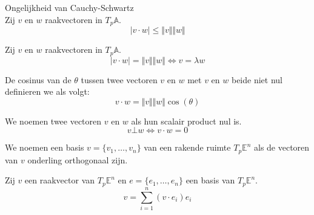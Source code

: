 \documentclass[main.tex]{subfiles}
\begin{document}
\begin{ei}
  Ongelijkheid van Cauchy-Schwartz\\
  Zij $v$ en $w$ raakvectoren in $T_{p}\mathbb{A}$.
  \[ |v \cdot w| \le \Vert v \Vert \Vert w \Vert \]
\end{ei}

\begin{ei}
  Zij $v$ en $w$ raakvectoren in $T_{p}\mathbb{A}$.
  \[ |v \cdot w| = \Vert v \Vert \Vert w \Vert \Leftrightarrow v = \lambda w \]
\end{ei}

\begin{de}
  De cosinus van de  $\theta$ tussen twee vectoren $v$ en $w$ met $v$ en $w$ beide niet nul definieren we als volgt:
  \[ v \cdot w = \Vert v \Vert \Vert w \Vert \cos(\theta) \]
\end{de}

\begin{de}
  We noemen twee vectoren $v$ en $w$  als hun scalair product nul is.
  \[ v \bot w \Leftrightarrow v \cdot w = 0 \]
\end{de}

\begin{de}
  We noemen een basis $v = \{ v_{1}, \dotsc, v_{n} \}$ van een rakende ruimte $T_{p}\mathbb{E}^{n}$  als de vectoren van $v$ onderling orthogonaal zijn.
\end{de}

\begin{st}
  Zij $v$ een raakvector van $T_{p}\mathbb{E}^{n}$ en $e = \{ e_{1}, \dotsc, e_{n} \}$ een basis van $T_{p}\mathbb{E}^{n}$.
  \[ v = \sum_{i=1}^{n} (v \cdot e_{i})e_{i} \]
\end{st}
\end{document}
